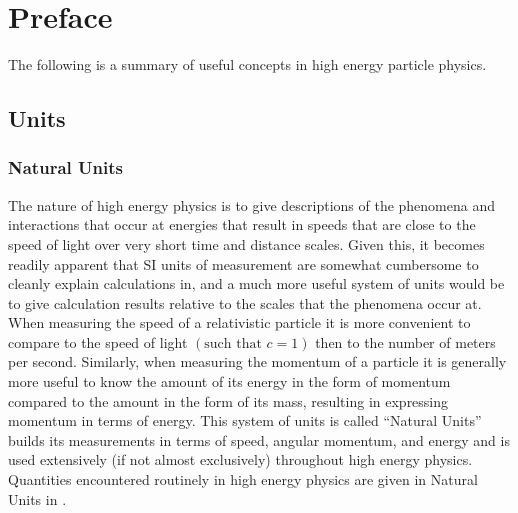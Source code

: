 \chapter*{Preface}\label{chapter:preface}

The following is a summary of useful concepts in high energy particle physics.

\section{Units}\label{section:units}

\subsection{Natural Units}\label{subsection:natural_units}

The nature of high energy physics is to give descriptions of the phenomena and interactions that occur at energies that result in speeds that are close to the speed of light over very short time and distance scales.
Given this, it becomes readily apparent that SI units of measurement are somewhat cumbersome to cleanly explain calculations in, and a much more useful system of units would be to give calculation results relative to the scales that the phenomena occur at.
When measuring the speed of a relativistic particle it is more convenient to compare to the speed of light $\left(\text{such that }c=1\right)$ then to the number of meters per second.
Similarly, when measuring the momentum of a particle it is generally more useful to know the amount of its energy in the form of momentum compared to the amount in the form of its mass, resulting in expressing momentum in terms of energy.
This system of units is called ``Natural Units'' builds its measurements in terms of speed, angular momentum, and energy and is used extensively (if not almost exclusively) throughout high energy physics.
Quantities encountered routinely in high energy physics are given in Natural Units in .

